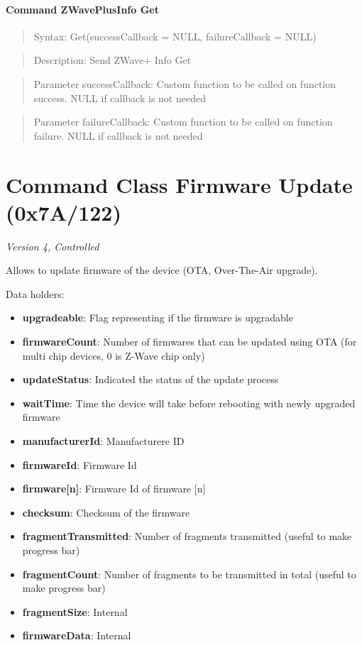 \paragraph{Command ZWavePlusInfo Get}
\begin{quote}Syntax: Get(successCallback = NULL, failureCallback = NULL)\end{quote}
\begin{quote}Description: Send ZWave+ Info Get\end{quote}
\begin{quote}Parameter successCallback: Custom function to be called on function success. NULL if callback is not needed\end{quote}
\begin{quote}Parameter failureCallback: Custom function to be called on function failure. NULL if callback is not needed\end{quote}



\section{Command Class Firmware Update (0x7A/122)}

\textit{Version 4, Controlled}
\newline

Allows to update firmware of the device (OTA, Over-The-Air upgrade).
\newline

\noindent
Data holders:

\begin{itemize}
\item \textbf{upgradeable}: Flag representing if the firmware is upgradable
\item \textbf{firmwareCount}: Number of firmwares that can be updated using OTA (for multi chip devices, 0 is Z-Wave chip only)
\item \textbf{updateStatus}: Indicated the status of the update process
\item \textbf{waitTime}: Time the device will take before rebooting with newly upgraded firmware
\item \textbf{manufacturerId}: Manufacturere ID
\item \textbf{firmwareId}: Firmware Id
\item \textbf{firmware[n]}: Firmware Id of firmware [n]
\item \textbf{checksum}: Checksum of the firmware
\item \textbf{fragmentTransmitted}: Number of fragments transmitted (useful to make progress bar)
\item \textbf{fragmentCount}: Number of fragments to be transmitted in total (useful to make progress bar)
\item \textbf{fragmentSize}: Internal
\item \textbf{firmwareData}: Internal
\end{itemize}

